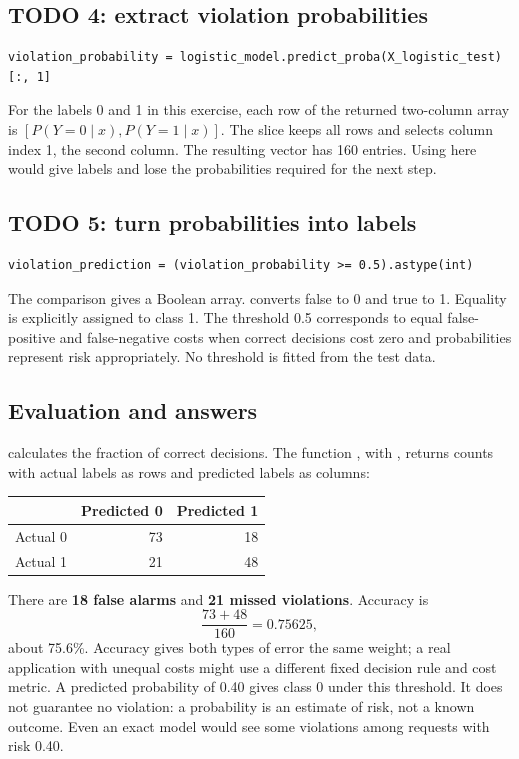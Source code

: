 \subsection{TODO 4: extract violation probabilities}
\begin{lstlisting}
violation_probability = logistic_model.predict_proba(X_logistic_test)[:, 1]
\end{lstlisting}
For the labels 0 and 1 in this exercise, each row of the returned two-column array is
$[P(Y=0\mid x),P(Y=1\mid x)]$. The slice \code{[:, 1]} keeps all rows and selects column index 1, the second column. The resulting vector has 160 entries. Using  here would give labels and lose the probabilities required for the next step.

\subsection{TODO 5: turn probabilities into labels}
\begin{lstlisting}
violation_prediction = (violation_probability >= 0.5).astype(int)
\end{lstlisting}
The comparison gives a Boolean array.  converts false to 0 and true to 1. Equality is explicitly assigned to class 1. The threshold 0.5 corresponds to equal false-positive and false-negative costs when correct decisions cost zero and probabilities represent risk appropriately. No threshold is fitted from the test data.

\subsection{Evaluation and answers}
 calculates the fraction of correct decisions. The function , with , returns counts with actual labels as rows and predicted labels as columns:
\begin{center}
\begin{tabular}{lrr}\toprule
&Predicted 0&Predicted 1\\\midrule
Actual 0&73&18\\
Actual 1&21&48\\\bottomrule
\end{tabular}
\end{center}
There are \textbf{18 false alarms} and \textbf{21 missed violations}. Accuracy is
\[\frac{73+48}{160}=0.75625,\]
about 75.6\%. Accuracy gives both types of error the same weight; a real application with unequal costs might use a different fixed decision rule and cost metric.
A predicted probability of 0.40 gives class 0 under this threshold. It does not guarantee no violation: a probability is an estimate of risk, not a known outcome. Even an exact model would see some violations among requests with risk 0.40.

